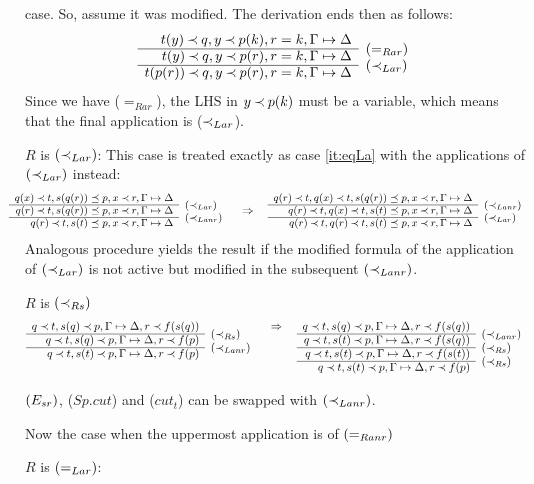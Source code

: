 \begin{PROOF}
\begin{LS}
case. So, assume it was modified. The derivation ends then as follows:
\[ \begin{array}{rl}
t(y) \Incl q, y\Incl p(k), r=k, \Gamma\Seq\Delta \\ \cline{1-1}
t(y)\Incl q, y\Incl p(r), r=k, \Gamma\Seq\Delta &
\rabove{\eRar} \\ \cline{1-1}
t(p(r))\Incl q, y\Incl p(r), r=k, \Gamma\Seq\Delta &
\rabove{\iLar} 
\end{array} 
\]
Since we have ($=_{Rar}$), the LHS in $y\mathbin{\prec} p(k)$ must be a variable, which means 
that the final application is ($\mathbin{\prec}_{Lar}$).
%
\item $R$ is $(\mathbin{\prec}_{Lar})$: This case is treated exactly as 
case \ref{it:eqLa}  with the applications of $(\mathbin{\prec}_{Lar})$ instead:
\[ \sma{ \begin{array}{rl}
q(x)\Incl t, s(q(r))\preceq p, x\Incl r, \GSD \cl
q(r)\Incl t, s(q(r))\preceq p, x\Incl r, \GSD  & \rabove{\iLar} \cl
q(r)\Incl t, s(t)\preceq p, x\Incl r, \GSD  & \rabove{\iLanr}
\end{array} 
\conv
 \begin{array}{rl}
q(r)\Incl t, q(x)\Incl t, s(q(r))\preceq p, x\Incl r, \GSD \cl
q(r)\Incl t, q(x)\Incl t, s(t)\preceq p, x\Incl r, \GSD  & \rabove{\iLanr} \cl
q(r)\Incl t, q(r)\Incl t, s(t)\preceq p, x\Incl r, \GSD  & \rabove{\iLar}
\end{array} } \]
Analogous procedure yields the result if the modified formula of the
application of $(\mathbin{\prec}_{Lar})$ is not active but modified in the subsequent $(\mathbin{\prec}_{Lanr})$.
%
\item $R$ is $(\mathbin{\prec}_{Rs})$
\[\prar{
q\Incl t, s(q)\Incl p, \GSD, r\Incl f(s(q)) \cl
q\Incl t, s(q)\Incl p, \GSD, r\Incl f(p) & \rabove{\iRs} \cl
q\Incl t, s(t)\Incl p, \GSD, r\Incl f(p) & \rabove{\iLanr} 
}
\conv
\prar{
q\Incl t, s(q)\Incl p, \GSD, r\Incl f(s(q)) \cl
q\Incl t, s(t)\Incl p, \GSD, r\Incl f(s(q)) & \rabove{\iLanr} \cl
q\Incl t, s(t)\Incl p, \GSD, r\Incl f(s(t)) & \rabove{\iRs} \cl
q\Incl t, s(t)\Incl p, \GSD, r\Incl f(p) & \rabove{\iRs} 
}
\]
\item $(E_{sr})$, ($Sp.cut$) and ($cut_t$) can be swapped with $(\mathbin{\prec}_{Lanr})$.
\end{LS}
Now the case when the uppermost application is of $(=_{Ranr})$
\begin{LS}
\item $R$ is $(=_{Lar})$: %

\end{LS}
\end{PROOF}

